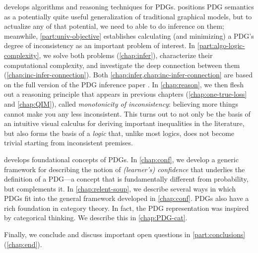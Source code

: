 { develops algorithms and reasoning techniques for PDGs.
 positions PDG semantics as a potentially quite useful generalization of traditional graphical models, but to actualize any of that potential, we need to able to do inference on them;
meanwhile, 
\cref{part:univ-objective} establishes calculating (and minimizing) a PDG's degree of inconsistency as an important problem of interest. 
In \cref{part:algo-logic-complexity}, we solve both problems (\cref{chap:infer}), characterize their computational complexity, and investigate the deep connection between them (\cref{chap:inc-infer-connection}). 
Both \cref{chap:infer,chap:inc-infer-connection} are based on the full version of the PDG inference paper \citep{pdg-infer}.
In \cref{chap:reason}, we then flesh out a
    reasoning principle that appears in previous chapters
    (\ref{chap:one-true-loss} and \ref{chap:QIM}),
    called \emph{monotonicity of inconsistency}: 
    believing more things cannot make you any less inconsistent. 
This turns out to not only be the basis of an intuitive visual calculus for deriving important inequalities in the literature, but also forms the basis of a \emph{logic} that, unlike most logics, does not become trivial starting from inconsistent premises.


 develops foundational concepts of PDGs. 
In \cref{chap:conf}, we develop a generic framework for describing the notion of \emph{(learner's) confidence} that underlies the definition of a PDG---a concept that is fundamentally different from probability, but complements it.
In \cref{chap:relent-soup}, we describe several ways in which PDGs fit into the general framework developed in \cref{chap:conf}.
PDGs also have a rich foundation in category theory.
In fact, the PDG representation was inspired by categorical thinking. 
We describe this in \cref{chap:PDG-cat}.
%

Finally, we conclude and discuss important open questions in 
    \cref{part:conclusions}
    (\cref{chap:end}). 
}
